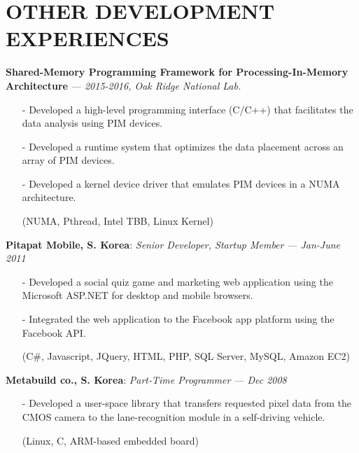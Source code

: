 \section{OTHER DEVELOPMENT EXPERIENCES} 
\vspace{0.03in}

  {\bf Shared-Memory Programming Framework for Processing-In-Memory Architecture}
   {\it \footnotesize --- 2015-2016, Oak Ridge National Lab.}
   \begin{itemize}[leftmargin=*]
    \setlength\itemsep{-0.02in}
    \item[-] Developed a high-level programming interface (C/C++) that
             facilitates the data analysis using PIM devices.
    \item[-] Developed a runtime system that optimizes the data placement across an array of
             PIM devices.
    \item[-] Developed a kernel device driver that emulates PIM devices in a NUMA architecture.
    \item[] {\small(NUMA, Pthread, Intel TBB, Linux Kernel)}
   \end{itemize}

  \vspace{-0.15in}
  {\bf Pitapat Mobile, S. Korea}: \emph{Senior Developer, Startup Member}
    {\it \footnotesize --- Jan-June 2011}
    \begin{itemize}[leftmargin=*]
    \setlength\itemsep{-0.02in}
     \item[-] Developed a social quiz game and marketing web application using 
              the Microsoft ASP.NET for desktop and mobile browsers.
     \item[-] Integrated the web application to the Facebook app platform using the Facebook API.
     \item[]  {\small(C\#, Javascript, JQuery, HTML, PHP, SQL Server, MySQL, Amazon EC2)}
\end{itemize}

  \vspace{-0.15in}
  {\bf Metabuild co., S. Korea}: \emph{Part-Time Programmer}
    {\it \footnotesize --- Dec 2008}
    \begin{itemize}[leftmargin=*]
    \setlength\itemsep{-0.02in}
     \item[-] Developed a user-space library that transfers requested pixel data
              from the CMOS camera
              to the lane-recognition module in a self-driving vehicle.
     \item[] {\small(Linux, C, ARM-based embedded board)}
\end{itemize}


